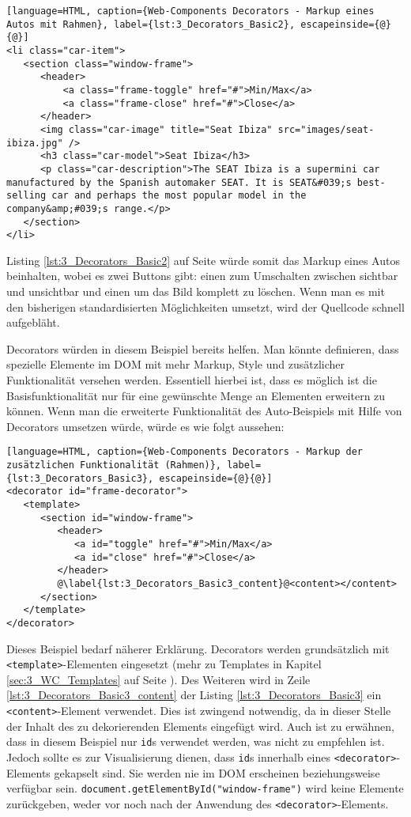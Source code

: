 \begin{lstlisting}[language=HTML, caption={Web-Components Decorators - Markup eines Autos mit Rahmen}, label={lst:3_Decorators_Basic2}, escapeinside={@}{@}]
<li class="car-item">
   <section class="window-frame">
      <header>
          <a class="frame-toggle" href="#">Min/Max</a>
          <a class="frame-close" href="#">Close</a>
      </header>
      <img class="car-image" title="Seat Ibiza" src="images/seat-ibiza.jpg" />
      <h3 class="car-model">Seat Ibiza</h3>
      <p class="car-description">The SEAT Ibiza is a supermini car manufactured by the Spanish automaker SEAT. It is SEAT&#039;s best-selling car and perhaps the most popular model in the company&amp;#039;s range.</p>
   </section>
</li>
\end{lstlisting}

Listing \ref{lst:3_Decorators_Basic2} auf Seite \pageref{lst:3_Decorators_Basic2} würde somit das Markup eines Autos beinhalten, wobei es zwei Buttons gibt: einen zum Umschalten zwischen sichtbar und unsichtbar und einen um das Bild komplett zu löschen.
Wenn man es mit den bisherigen standardisierten Möglichkeiten umsetzt, wird der Quellcode schnell aufgebläht.

Decorators würden in diesem Beispiel bereits helfen. Man könnte definieren, dass spezielle Elemente im DOM mit mehr Markup, Style und zusätzlicher Funktionalität versehen werden. Essentiell hierbei ist, dass es möglich ist die Basisfunktionalität nur für eine gewünschte Menge an Elementen erweitern zu können. Wenn man die erweiterte Funktionalität des Auto-Beispiels mit Hilfe von Decorators umsetzen würde, würde es wie folgt aussehen:

\begin{lstlisting}[language=HTML, caption={Web-Components Decorators - Markup der zusätzlichen Funktionalität (Rahmen)}, label={lst:3_Decorators_Basic3}, escapeinside={@}{@}]
<decorator id="frame-decorator">
   <template>
      <section id="window-frame">
         <header>
            <a id="toggle" href="#">Min/Max</a>
            <a id="close" href="#">Close</a>
         </header>
         @\label{lst:3_Decorators_Basic3_content}@<content></content>
      </section>
   </template>
</decorator>
\end{lstlisting}

Dieses Beispiel bedarf näherer Erklärung. Decorators werden grundsätzlich mit \lstinline|<template>|-Elementen eingesetzt (mehr zu Templates in Kapitel \ref{sec:3_WC_Templates} auf Seite \pageref{sec:3_WC_Templates}). Des Weiteren wird in Zeile \ref{lst:3_Decorators_Basic3_content} der Listing \ref{lst:3_Decorators_Basic3} ein \lstinline|<content>|-Element verwendet. Dies ist zwingend notwendig, da in dieser Stelle der Inhalt des zu dekorierenden Elements eingefügt wird. Auch ist zu erwähnen, dass in diesem Beispiel nur \lstinline|id|s verwendet werden, was nicht zu empfehlen ist. Jedoch sollte es zur Visualisierung dienen, dass \lstinline|id|s innerhalb eines \lstinline|<decorator>|-Elements gekapselt sind. Sie werden nie im DOM erscheinen beziehungsweise verfügbar sein. \lstinline|document.getElementById("window-frame")| wird keine Elemente zurückgeben, weder vor noch nach der Anwendung des \lstinline|<decorator>|-Elements.


